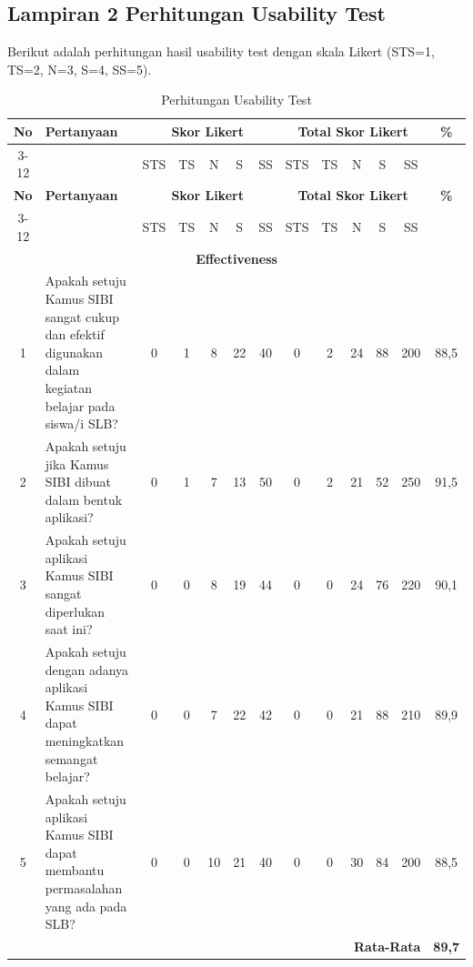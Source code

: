 \documentclass[a4paper,11pt,oneside]{report}
\begin{document}
\clearpage
\begin{landscape}
\section*{Lampiran 2 Perhitungan Usability Test}
\label{sec:lampiran-perhitungan}
Berikut adalah perhitungan hasil usability test dengan skala Likert
(STS=1, TS=2, N=3, S=4, SS=5).

\scriptsize
\setlength{\tabcolsep}{2pt}
\renewcommand{\arraystretch}{0.9}
\begin{longtable}{|c|p{5.5cm}|c|c|c|c|c|c|c|c|c|c|c|}
    \caption{Perhitungan Usability Test} \\
    \hline
    \textbf{No} & \textbf{Pertanyaan} & \multicolumn{5}{c|}{\textbf{Skor Likert}} & \multicolumn{5}{c|}{\textbf{Total Skor Likert}} & \textbf{\%} \\ \cline{3-12}
     & & STS & TS & N & S & SS & STS & TS & N & S & SS & \\ \hline
    \endfirsthead
    \hline
    \textbf{No} & \textbf{Pertanyaan} & \multicolumn{5}{c|}{\textbf{Skor Likert}} & \multicolumn{5}{c|}{\textbf{Total Skor Likert}} & \textbf{\%} \\ \cline{3-12}
     & & STS & TS & N & S & SS & STS & TS & N & S & SS & \\ \hline
    \endhead
    \multicolumn{13}{|c|}{\textbf{Effectiveness}} \\ \hline
    1 & Apakah setuju Kamus SIBI sangat cukup dan efektif digunakan dalam kegiatan belajar pada siswa/i SLB? & 0 & 1 & 8 & 22 & 40 & 0 & 2 & 24 & 88 & 200 & 88,5 \\ \hline
    2 & Apakah setuju jika Kamus SIBI dibuat dalam bentuk aplikasi? & 0 & 1 & 7 & 13 & 50 & 0 & 2 & 21 & 52 & 250 & 91,5 \\ \hline
    3 & Apakah setuju aplikasi Kamus SIBI sangat diperlukan saat ini? & 0 & 0 & 8 & 19 & 44 & 0 & 0 & 24 & 76 & 220 & 90,1 \\ \hline
    4 & Apakah setuju dengan adanya aplikasi Kamus SIBI dapat meningkatkan semangat belajar? & 0 & 0 & 7 & 22 & 42 & 0 & 0 & 21 & 88 & 210 & 89,9 \\ \hline
    5 & Apakah setuju aplikasi Kamus SIBI dapat membantu permasalahan yang ada pada SLB? & 0 & 0 & 10 & 21 & 40 & 0 & 0 & 30 & 84 & 200 & 88,5 \\ \hline
    \multicolumn{12}{|r|}{\textbf{Rata-Rata}} & \textbf{89,7} \\ \hline

\end{longtable}
\end{landscape}
\end{document}
